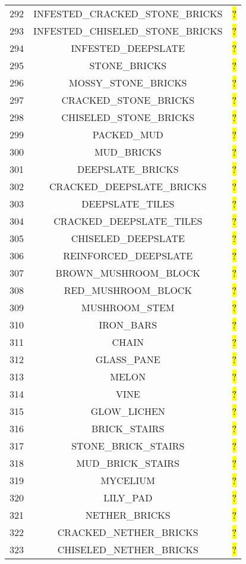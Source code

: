 \documentclass[11pt]{article}
\newcommand\myworries[1]{\sethlcolor{red}\hl{#1}}
\begin{document}
\begin{longtable}{ |c|c|c| }
292 & INFESTED\_CRACKED\_STONE\_BRICKS & \myworries{?} \\
293 & INFESTED\_CHISELED\_STONE\_BRICKS & \myworries{?} \\
294 & INFESTED\_DEEPSLATE & \myworries{?} \\
295 & STONE\_BRICKS & \myworries{?} \\
296 & MOSSY\_STONE\_BRICKS & \myworries{?} \\
297 & CRACKED\_STONE\_BRICKS & \myworries{?} \\
298 & CHISELED\_STONE\_BRICKS & \myworries{?} \\
299 & PACKED\_MUD & \myworries{?} \\
300 & MUD\_BRICKS & \myworries{?} \\
301 & DEEPSLATE\_BRICKS & \myworries{?} \\
302 & CRACKED\_DEEPSLATE\_BRICKS & \myworries{?} \\
303 & DEEPSLATE\_TILES & \myworries{?} \\
304 & CRACKED\_DEEPSLATE\_TILES & \myworries{?} \\
305 & CHISELED\_DEEPSLATE & \myworries{?} \\
306 & REINFORCED\_DEEPSLATE & \myworries{?} \\
307 & BROWN\_MUSHROOM\_BLOCK & \myworries{?} \\
308 & RED\_MUSHROOM\_BLOCK & \myworries{?} \\
309 & MUSHROOM\_STEM & \myworries{?} \\
310 & IRON\_BARS & \myworries{?} \\
311 & CHAIN & \myworries{?} \\
312 & GLASS\_PANE & \myworries{?} \\
313 & MELON & \myworries{?} \\
314 & VINE & \myworries{?} \\
315 & GLOW\_LICHEN & \myworries{?} \\
316 & BRICK\_STAIRS & \myworries{?} \\
317 & STONE\_BRICK\_STAIRS & \myworries{?} \\
318 & MUD\_BRICK\_STAIRS & \myworries{?} \\
319 & MYCELIUM & \myworries{?} \\
320 & LILY\_PAD & \myworries{?} \\
321 & NETHER\_BRICKS & \myworries{?} \\
322 & CRACKED\_NETHER\_BRICKS & \myworries{?} \\
323 & CHISELED\_NETHER\_BRICKS & \myworries{?} \\

\end{longtable}
\end{document}
